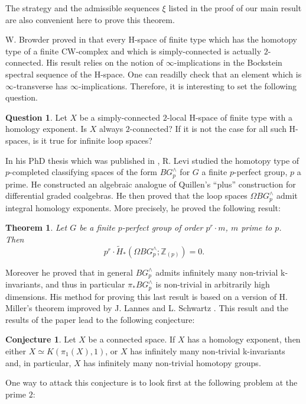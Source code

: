 \documentclass{amsart}
\newtheorem*{thm*}{Theorem}
\theoremstyle{definition}
\newtheorem*{conj*}{Conjecture}
\newtheorem*{quest*}{Question}
\theoremstyle{remark}
\newcommand{\Z}{\mathbb{Z}}
\begin{document}
The strategy and the admissible sequences $\xi$ listed in the proof of our main result are also convenient here to prove this theorem. 

\bigskip
W. Browder proved in \cite[Theorem 6.11, p. 46]{Br61} that every H-space of finite type which has the homotopy type of a finite CW-complex and which is simply-connected is actually $2$-connected. His result relies on the notion of $\infty$-implications in the Bockstein spectral sequence of the H-space. One can readilly check that an element which is $\infty$-transverse has $\infty$-implications. Therefore, it is interesting to set the following question. 

\begin{quest*}
Let $X$ be a simply-connected $2$-local H-space of finite type with a homology exponent. Is $X$ always $2$-connected? If it is not the case for all such H-spaces, is it true for infinite loop spaces?
\end{quest*}

\bigskip
In his PhD thesis which was published in \cite{Le95}, R. Levi studied the homotopy type of $p$-completed classifying spaces of the form $BG^\wedge_p$ for $G$ a finite $p$-perfect group, $p$ a prime. He constructed an algebraic analogue of Quillen's ``plus'' construction for differential graded coalgebras. He then proved that the loop spaces $\Omega BG^\wedge_p$ admit integral homology exponents. More precisely, he proved the following result:
\begin{thm*}
Let $G$ be a finite $p$-perfect group of order $p^r\cdot m$, $m$ prime to $p$. Then
$$
p^r\cdot\widetilde{H}_*(\Omega BG^\wedge_p;\Z_{(p)})=0.
$$
\end{thm*}
Moreover he proved that in general $BG^\wedge_p$ admits infinitely many non-trivial k-invariants, and thus in particular $\pi_*BG^\wedge_p$ is non-trivial in arbitrarily high dimensions. His method for proving this last result is based on a version of H. Miller's theorem improved by J. Lannes and L. Schwartz \cite{LS86}. This result and the results of the paper lead to the following conjecture:

\begin{conj*}
Let $X$ be a connected space. If $X$ has a homology exponent, then either $X\simeq K(\pi_1(X),1)$, or $X$ has infinitely many non-trivial k-invariants and, in particular, $X$ has infinitely many non-trivial homotopy groups. 
\end{conj*}

One way to attack this conjecture is to look first at the following problem at the prime $2$:
\end{document}
